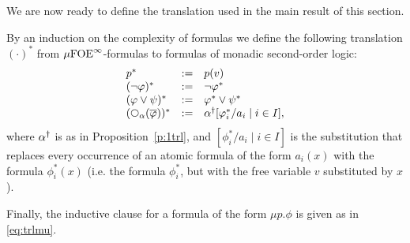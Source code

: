 \noindent
We are now ready to define the translation used in the main result of this 
section.

\begin{definition}
By an induction on the complexity of formulas we define the following 
translation $(\cdot)^{*}$ from $\mu\mathrm{FOE}^{\infty}$-formulas to formulas of monadic 
second-order logic:
\[\begin{array}{lll}
   p^{*} &\df& p(v)
\\ (\neg\phi)^{*}        &\df& \neg \phi^{*}
\\ (\phi\lor\psi)^{*}    &\df& \phi^{*} \lor \psi^{*}
\\ (\nxt{\al}(\ol{\phi}))^{*} &\df& \al^{\dag}[\phi_{i}^{*}/a_{i} \mid i \in I],
\end{array}\]
where $\alpha^{\dag}$ is as in Proposition~\ref{p:1trl}, and $[\phi_{i}^{*}/a_{i}
\mid i \in I]$ is the substitution that replaces every occurrence of an atomic
formula of the form $a_{i}(x)$ with the formula $\phi_{i}^{*}(x)$ (i.e. the 
formula $\phi_{i}^{*}$, but with the free variable $v$ substituted by $x$).

Finally, the inductive clause for a formula of the form $\mu p.\phi$ is given
as in \eqref{eq:trlmu}.
\end{definition}

